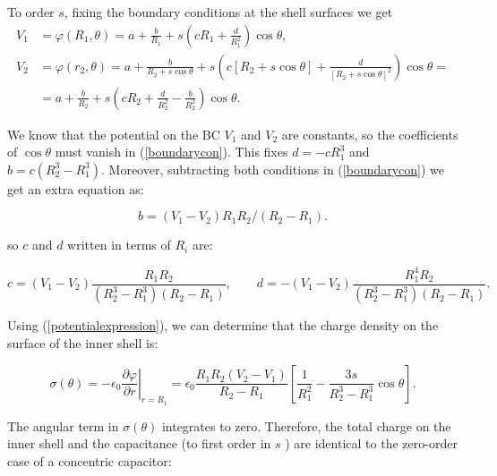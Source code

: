 To order $s$, fixing the boundary conditions at the shell surfaces we get
\begin{equation}
	\begin{split}\label{boundarycon}
		V_{1}&=\varphi\left(R_{1}, \theta\right)=a+\frac{b}{R_{1}}+s\left(c R_{1}+\frac{d}{R_{1}^{2}}\right) \cos \theta,\\
		V_{2}&=\varphi\left(r_{2}, \theta\right) =a+\frac{b}{R_{2}+s \cos \theta}+s\left(c\left[R_{2}+s \cos \theta\right]+\frac{d}{\left[R_{2}+s \cos \theta\right]^{2}}\right) \cos \theta= \\
		&=a+\frac{b}{R_{2}}+s\left(c R_{2}+\frac{d}{R_{2}^{2}}-\frac{b}{R_{2}^{2}}\right) \cos \theta.
	\end{split}
\end{equation}

We know that the potential on the BC $V_{1}$ and $V_{2}$ are constants, so the coefficients of $\cos \theta$ must vanish in (\ref{boundarycon}). This fixes $d=-c R_{1}^{3}$ and $b=c\left(R_{2}^{3}-R_{1}^{3}\right) .$ Moreover, subtracting both conditions in (\ref{boundarycon}) we get an extra equation as:

\begin{equation}
	b=\left(V_{1}-V_{2}\right) R_{1} R_{2} /\left(R_{2}-R_{1}\right).
\end{equation}

so $c$ and $d$ written in terms of $R_{i}$ are:

\begin{equation}
	c=\left(V_{1}-V_{2}\right) \frac{R_{1} R_{2}}{\left(R_{2}^{3}-R_{1}^{3}\right)\left(R_{2}-R_{1}\right)}, \quad \quad d=-\left(V_{1}-V_{2}\right) \frac{R_{1}^{4} R_{2}}{\left(R_{2}^{3}-R_{1}^{3}\right)\left(R_{2}-R_{1}\right)}.
\end{equation}

Using (\ref{potentialexpression}), we can determine that the charge density on the surface of the inner shell is:

\begin{equation}
	\sigma(\theta)=-\left.\epsilon_{0} \frac{\partial \varphi}{\partial r}\right|_{r=R_{1}}=\epsilon_{0} \frac{R_{1} R_{2}\left(V_{2}-V_{1}\right)}{R_{2}-R_{1}}\left[\frac{1}{R_{1}^{2}}-\frac{3 s}{R_{2}^{3}-R_{1}^{3}} \cos \theta\right].
\end{equation}

The angular term in $\sigma(\theta)$ integrates to zero. Therefore, the total charge on the inner shell and the capacitance (to first order in $s$ ) are identical to the zero-order case of a concentric capacitor:

